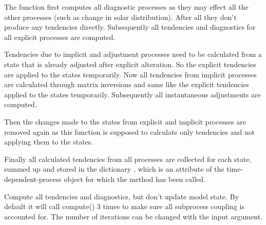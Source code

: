 \documentclass[letterpaper,10pt,english]{sphinxmanual}
\begin{document}
\begin{fulllineitems}
\begin{fulllineitems}
The function first computes all diagnostic processes as they may effect
all the other processes (such as change in solar distribution).
After all they don't produce any tendencies directly. Subsequently
all tendencies and diagnostics for all explicit processes are computed.

Tendencies due to implicit and adjustment processes need to be
calculated from a state that is already adjusted after explicit 
alteration. So the explicit tendencies are applied to the states 
temporarily. Now all tendencies from implicit processes are calculated 
through matrix inversions and same like the explicit tendencies applied
to the states temporarily. Subsequently all instantaneous adjustments 
are computed.

Then the changes made to the states from explicit and implicit 
processes are removed again as this {\hyperref[api/climlab.process:climlab.process.time_dependent_process.TimeDependentProcess.compute]{\emph{}}} function is
supposed to calculate only tendencies and not applying them to the states.

Finally all calculated tendencies from all processes are collected 
for each state, summed up and stored in the dictionary 
, which is an attribute of the time-dependent-process 
object for which the  method has been called.

\end{fulllineitems}


\begin{fulllineitems}
\label{api/climlab.process:climlab.process.time_dependent_process.TimeDependentProcess.compute_diagnostics}
Compute all tendencies and diagnostics, but don't update model state.
By default it will call compute() 3 times to make sure all
subprocess coupling is accounted for. The number of iterations can
be changed with the input argument.

\end{fulllineitems}



\end{fulllineitems}
\end{document}
